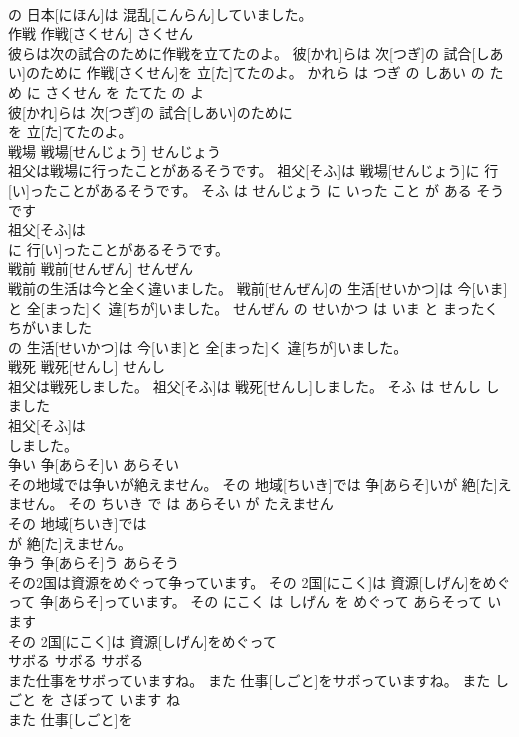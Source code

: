 \documentclass[8pt]{extreport}
\begin{document}
\begin{CJK}{UTF8}{min}
\\	の 日本[にほん]は 混乱[こんらん]していました。			
\\	作戦	作戦[さくせん]	さくせん	
\\	彼らは次の試合のために作戦を立てたのよ。	彼[かれ]らは 次[つぎ]の 試合[しあい]のために 作戦[さくせん]を 立[た]てたのよ。	かれら は つぎ の しあい の ため に さくせん を たてた の よ	
\\	彼[かれ]らは 次[つぎ]の 試合[しあい]のために
\\	を 立[た]てたのよ。			
\\	戦場	戦場[せんじょう]	せんじょう	
\\	祖父は戦場に行ったことがあるそうです。	祖父[そふ]は 戦場[せんじょう]に 行[い]ったことがあるそうです。	そふ は せんじょう に いった こと が ある そう です	
\\	祖父[そふ]は
\\	に 行[い]ったことがあるそうです。			
\\	戦前	戦前[せんぜん]	せんぜん	
\\	戦前の生活は今と全く違いました。	戦前[せんぜん]の 生活[せいかつ]は 今[いま]と 全[まった]く 違[ちが]いました。	せんぜん の せいかつ は いま と まったく ちがいました	
\\	の 生活[せいかつ]は 今[いま]と 全[まった]く 違[ちが]いました。			
\\	戦死	戦死[せんし]	せんし	
\\	祖父は戦死しました。	祖父[そふ]は 戦死[せんし]しました。	そふ は せんし しました	
\\	祖父[そふ]は
\\	しました。			
\\	争い	争[あらそ]い	あらそい	
\\	その地域では争いが絶えません。	その 地域[ちいき]では 争[あらそ]いが 絶[た]えません。	その ちいき で は あらそい が たえません	
\\	その 地域[ちいき]では
\\	が 絶[た]えません。			
\\	争う	争[あらそ]う	あらそう	
\\	その2国は資源をめぐって争っています。	その 2国[にこく]は 資源[しげん]をめぐって 争[あらそ]っています。	その にこく は しげん を めぐって あらそって います	
\\	その 2国[にこく]は 資源[しげん]をめぐって
\\	サボる	サボる	サボる	
\\	また仕事をサボっていますね。	また 仕事[しごと]をサボっていますね。	また しごと を さぼって います ね	
\\	また 仕事[しごと]を

\end{CJK}
\end{document}
